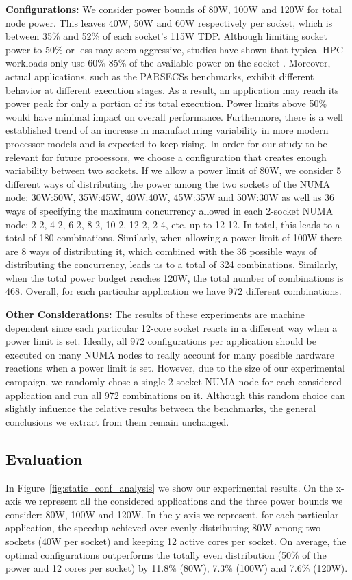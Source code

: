 {\bf Configurations:} We consider power bounds of 80W, 100W and 120W for total
node power.  This leaves 40W, 50W and 60W respectively per socket, which is 
between 35\% and 52\% of each socket's 115W TDP.
Although limiting socket power to 50\% or less may seem
aggressive, studies have shown that typical HPC workloads only use 60\%-85\% of
the available power on the socket \cite{Patki:2015:PRM:2749246.2749262}.  Moreover,
actual applications, such as the PARSECSs benchmarks, exhibit different
behavior at different execution stages.  As a result, an application may
reach its power peak for only a portion of its total execution.
Power limits above 50\% would have minimal impact on overall performance.
Furthermore,  there is a well established trend of an increase in manufacturing
variability in more modern processor models
\cite{Marathe:2017:ESP:3149412.3149421} and is expected to keep rising.  In
order for our study to be relevant for future processors, we choose a
configuration that creates enough variability between two sockets.  If we allow
a power limit of 80W, we consider 5 different ways of distributing the power
among the two sockets of the NUMA node: 30W:50W, 35W:45W, 40W:40W, 45W:35W and
50W:30W as well as 36 ways of specifying the maximum concurrency allowed in
each 2-socket NUMA node: 2-2, 4-2, 6-2, 8-2, 10-2, 12-2, 2-4, etc.  up to
12-12.  In total, this leads to a total of 180 combinations.  Similarly, when
allowing a power limit of 100W there are 8 ways of distributing it, which
combined with the 36 possible ways of distributing the concurrency, leads us to
a total of 324 combinations.  Similarly, when the total power budget reaches
120W, the total number of combinations is 468.  Overall, for each particular
application we have 972 different combinations.

{\bf Other Considerations:} The results of these experiments are machine dependent since
each particular 12-core socket reacts in a different way when a power limit is set.
Ideally, all  972 configurations per application should be executed on many NUMA nodes to
really account for many possible hardware reactions when a power limit is set.  However,
due to the size of our experimental campaign, we randomly chose a single 2-socket NUMA
node for each considered application and run all 972 combinations on it.  Although this
random choice can slightly influence the relative results between the benchmarks, the
general conclusions we extract from them remain unchanged.

\subsection{Evaluation}
\label{sec:static_evaluation}
In Figure~\ref{fig:static_conf_analysis} we show our experimental results.  On the x-axis
we represent all the considered applications and the three power bounds we consider: 80W,
100W and 120W.  In the y-axis we represent, for each particular application, the speedup
achieved over evenly distributing 80W among two sockets (40W per socket) and keeping 12
active cores per socket.  On average, the optimal configurations outperforms the totally
even distribution (50\% of the power and 12 cores per socket) by 11.8\% (80W), 7.3\%
(100W) and 7.6\% (120W).

